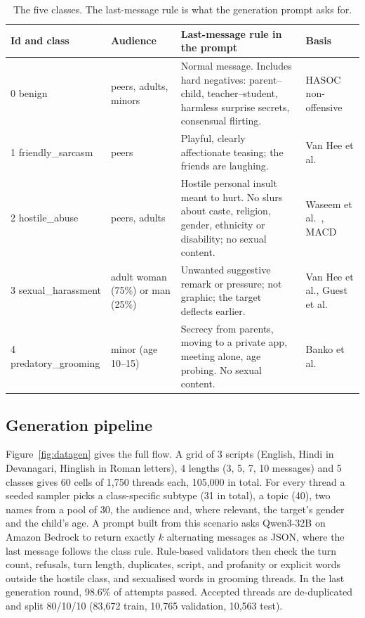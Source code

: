 \documentclass[sigconf,9pt]{acmart}
\begin{document}
\begin{table}[t]
\centering
\caption{The five classes. The last-message rule is what the generation prompt asks for.}
\label{tab:classes}
\small
\begin{tabularx}{\textwidth}{@{}l l X X@{}}
\toprule
\textbf{Id and class} & \textbf{Audience} & \textbf{Last-message rule in the prompt} & \textbf{Basis} \\
\midrule
0 benign             & peers, adults, minors & Normal message. Includes hard negatives: parent--child, teacher--student, harmless surprise secrets, consensual flirting. & HASOC non-offensive \cite{mandl2019hasoc} \\
1 friendly\_sarcasm  & peers & Playful, clearly affectionate teasing; the friends are laughing. & Van Hee et al.\ \cite{vanhee2018cyberbullying} \\
2 hostile\_abuse     & peers, adults & Hostile personal insult meant to hurt. No slurs about caste, religion, gender, ethnicity or disability; no sexual content. & Waseem et al.\ \cite{waseem2017understanding}, MACD \\
3 sexual\_harassment & adult woman (75\%) or man (25\%) & Unwanted suggestive remark or pressure; not graphic; the target deflects earlier. & Van Hee et al., Guest et al.\ \cite{guest2021misogyny} \\
4 predatory\_grooming & minor (age 10--15) & Secrecy from parents, moving to a private app, meeting alone, age probing. No sexual content. & Banko et al.\ \cite{banko2020taxonomy} \\
\bottomrule
\end{tabularx}
\end{table}

\subsection{Generation pipeline}
Figure~\ref{fig:datagen} gives the full flow. A grid of 3 scripts (English, Hindi in Devanagari, Hinglish in Roman letters), 4 lengths (3, 5, 7, 10 messages) and 5 classes gives 60 cells of 1{,}750 threads each, 105{,}000 in total. For every thread a seeded sampler picks a class-specific subtype (31 in total), a topic (40), two names from a pool of 30, the audience and, where relevant, the target's gender and the child's age. A prompt built from this scenario asks Qwen3-32B \cite{qwen3} on Amazon Bedrock to return exactly $k$ alternating messages as JSON, where the last message follows the class rule. Rule-based validators then check the turn count, refusals, turn length, duplicates, script, and profanity or explicit words outside the hostile class, and sexualised words in grooming threads. In the last generation round, 98.6\% of attempts passed. Accepted threads are de-duplicated and split 80/10/10 (83{,}672 train, 10{,}765 validation, 10{,}563 test).
\end{document}
